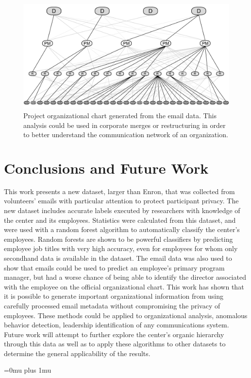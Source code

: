 \documentclass[10pt,twocolumn,conference]{IEEEtran}
\begin{document}
\begin{figure}[t]
	\centering
	\includegraphics[width=\columnwidth,trim={0mm 1mm 0mm 1mm},clip]{orgChart_3con_BW}
    \vspace{-17pt}
	\caption{Project organizational chart generated from the email data. This analysis could be used in corporate merges or restructuring in order to better understand the communication network of an organization.}
	\vspace{-18pt}
	\label{fig:org_chart}
\end{figure}

\section{Conclusions and Future Work} \label{Conclusions}
This work presents a new dataset, larger than Enron, that was collected from volunteers' emails with particular attention to protect participant privacy.
The new dataset includes accurate labels executed by researchers with knowledge of the center and its employees.
Statistics were calculated from this dataset, and were used with a random forest algorithm to automatically classify the center's employees.
Random forests are shown to be powerful classifiers by predicting employee job titles with very high accuracy, even for employees for whom only secondhand data is available in the dataset.
The email data was also used to show that emails could be used to predict an employee's primary program manager, but had a worse chance of being able to identify the director associated with the employee on the official organizational chart.
This work has shown that it is possible to generate important organizational information from using carefully processed email metadata without compromising the privacy of employees.
These methods could be applied to organizational analysis, anomalous behavior detection, leadership identification of any communications system.
Future work will attempt to further explore the center's organic hierarchy through this data as well as to apply these algorithms to other datasets to determine the general applicability of the results.

\Urlmuskip=0mu plus 1mu\relax


\end{document}
